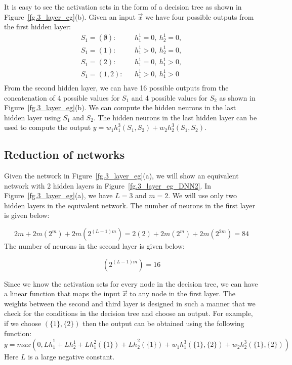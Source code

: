 \documentclass[runningheads,a4paper]{llncs}
\begin{document}
It is easy to see the activation sets in the form of a decision tree as shown in Figure~\ref{fg.3_layer_eg}(b). Given an input $\vec{x}$ we have four possible outputs from the first hidden layer:
\begin{eqnarray*}
S_1=(\emptyset):&& h^1_1 = 0,~h^1_2 = 0,\\
S_1=(1):&& h^1_1 > 0,~h^1_2 = 0,\\
S_1=(2):&& h^1_1 = 0,~h^1_1 > 0,\\
S_1=(1,2):&& h^1_1 > 0,~h^1_1 > 0\\
\end{eqnarray*} 
From the second hidden layer, we can have 16 possible outputs from the concatenation of 4 possible values for $S_1$ and 4 possible values for $S_2$ as shown in Figure~\ref{fg.3_layer_eg}(b). We can compute the hidden neurons in the last hidden layer using $S_1$ and $S_2$. The hidden neurons in the last hidden layer can be used to compute the output $y=w_1 h^3_1 (S_1,S_2) + w_2 h^3_2 (S_1,S_2)$. 

\subsection{Reduction of networks}
Given the network in Figure~\ref{fg.3_layer_eg}(a), we will show an equivalent network with 2 hidden layers in Figure~\ref{fg.3_layer_eg_DNN2}. In Figure~\ref{fg.3_layer_eg}(a), we have $L=3$ and $m=2$. We will use only two hidden layers in the equivalent network. The number of neurons in the first layer is given below:

\begin{equation}
2m + 2m(2^m) + 2m(2^{(L-1)m}) = 2(2) + 2m(2^m) + 2m(2^{2m}) = 84
\end{equation}
The number of neurons in the second layer is given below:

\begin{equation}
(2^{(L-1)m})=16 
\end{equation}

Since we know the activation sets for every node in the decision tree, we can have a linear function that maps the input $\vec{x}$ to any node in the first layer. The weights between the second and third layer is designed in such a manner that we check for the conditions in the decision tree and choose an output. For example, if we choose $(\{1\},\{2\})$ then the output can be obtained using the following function:
$y=max(0,L \bar{h}^1_1 + L h^1_2 + L h^2_1(\{1\}) + L \bar{h}^2_2(\{1\}) + w_1 h^3_1(\{1\},\{2\}) + w_2 h^3_2(\{1\},\{2\}))$
Here $L$ is a large negative constant. 
\end{document}
